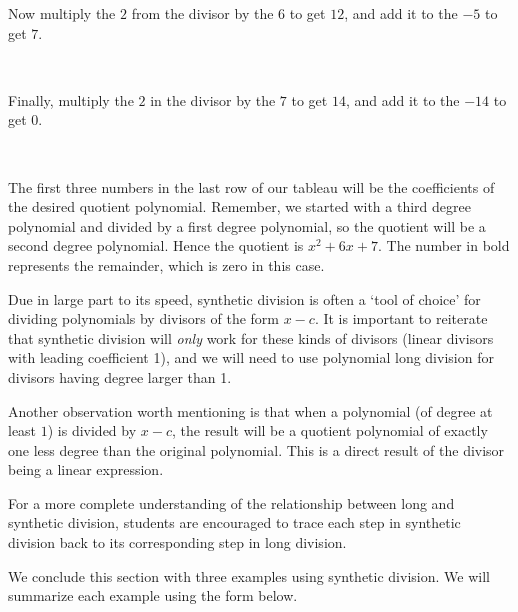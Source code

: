 \documentclass[12pt]{book}
\theoremstyle{definition}
\begin{document}
Now multiply the $2$ from the divisor by the $6$ to get $12$, and add it to the $-5$ to get $7$.

\begin{center}
\begin{multicols}{2}
\\
\end{multicols}
\end{center}

Finally, multiply the $2$ in the divisor by the $7$ to get $14$, and add it to the $-14$ to get $0$.

\begin{center}
\begin{multicols}{2}
\\
\end{multicols}
\end{center}
The first three numbers in the last row of our tableau will be the coefficients of the desired quotient polynomial.  Remember, we started with a third degree polynomial and divided by a first degree polynomial, so the quotient will be a second degree polynomial.  Hence the quotient is $x^2+6x+7$.  The number in bold represents the remainder, which is zero in this case.\par
Due in large part to its speed, synthetic division is often a `tool of choice' for dividing polynomials by divisors of the form $x-c$.  It is important to reiterate that synthetic division will \emph{only} work for these kinds of divisors (linear divisors with leading coefficient 1), and we will need to use polynomial long division for divisors having degree larger than 1.\par
Another observation worth mentioning is that when a polynomial (of degree at least $1$) is divided by $x-c$, the result will be a quotient polynomial of exactly one less degree than the original polynomial.  This is a direct result of the divisor being a linear expression.\par
For a more complete understanding of the relationship between long and synthetic division, students are encouraged to trace each step in synthetic division back to its corresponding step in long division.\par
We conclude this section with three examples using synthetic division.  We will summarize each example using the form below.
\end{document}
